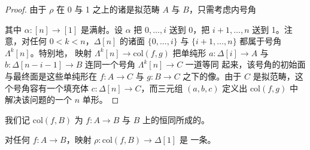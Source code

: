 \begin{proof}
由于 $\rho$ 在 0 与 1 之上的诸\trFiber{}是拟范畴 $A$ 与 $B$，只需考虑内号角
\begin{center}
\end{center}
其中 $\alpha\colon[n]\to[1]$ 是满射。设 $\alpha$ 把 $0,\dotsc,i$ 送到 0，把
$i+1,\dotsc,n$ 送到 1。注意，对任何 $0<k<n$，$\Delta[n]$ 的诸面
$\{0,\dotsc,i\}$ 与 $\{i+1,\dotsc,n\}$ 都属于号角 $\Lambda^{k}[n]$。特别地，
映射 $\Lambda^{k}[n]\to\mathrm{col}(f,g)$ 把单纯形 $a\colon\Delta[i]\to A$
与 $b\colon\Delta[n-i-1]\to B$ 连同一个号角 $\Lambda^{k}[n]\to C$ 一道等同
起来，该号角的初始面与最终面是这些单纯形在 $f\colon A\to C$ 与
$g\colon B\to C$ 之下的像。由于 $C$ 是拟范畴，这个号角容有一个填充体
$c\colon\Delta[n]\to C$，而三元组 $(a,b,c)$ 定义出 $\mathrm{col}(f,g)$ 中
解决该\trLifting{}问题的一个 $n$ 单形。
\end{proof}

我们记 $\mathrm{col}(f,B)$ 为 $f\colon A\to B$ 与 $B$ 上的恒同所成的\trCollage。

\begin{lemma}\label{lem:collage-cocartesian-fibration}
对任何 $f\colon A\to B$，映射 $\rho\colon\mathrm{col}(f,B)\to\Delta[1]$ 是
一条\trCocartesianFibration。
\end{lemma}

